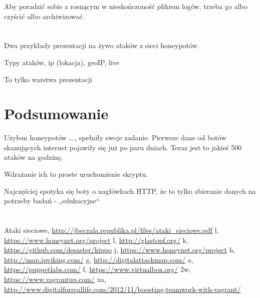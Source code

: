 \documentclass[runningheads,a4paper]{llncs}
\begin{document}
Aby poradzić sobie z rosnącym w nieskończoność plikiem logów, trzeba go albo czyścić albo archiwizować.

\section{}
Dwa przykłady prezentacji na żywo ataków z sieci honeypotów.

Typy ataków, ip (lokacja), geoIP, live

To tylko warstwa prezentacji
\section{Podsumowanie}
Użyłem honeypotów ..., spełniły swoje zadanie. Pierwsze dane od botów skanujących internet pojawiły się już po paru dniach. Teraz jest to jakieś 500 ataków na godzinę.

Wdrażanie ich to proste uruchomienie skryptu.

Najczęściej spotyka się boty o nagłówkach HTTP, że to tylko zbieranie danych na potrzeby badań - „edukacyjne“

\section{}
\begin{thebibliography}{1}


\bibitem{} Ataki sieciowe,
\url{http://jbeczala.republika.pl/files/ataki_sieciowe.pdf}
 l, \url{https://www.honeynet.org/project}
\bibitem{} l,
\url{http://glastopf.org/}
\bibitem{} k,
\url{https://github.com/desaster/kippo}
\bibitem{} j,
\url{https://www.honeynet.org/project}
\bibitem{} h,
\url{http://map.ipviking.com/}
\bibitem{} g,
\url{http://digitalattackmap.com/}
\bibitem{} a,
\url{https://puppetlabs.com/}
\bibitem{} f,
\url{https://www.virtualbox.org/}
\bibitem{} 2w,
\url{https://www.vagrantup.com/}
\bibitem{} xa,
\url{http://www.digitalforreallife.com/2012/11/boosting-teamwork-with-vagrant/}


\end{thebibliography}
\end{document}
